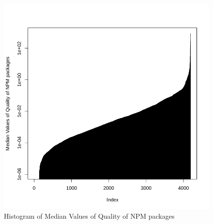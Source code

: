 \documentclass[smallcondensed]{svjour3}     %
\begin{document}
\begin{figure}[!t]
\centering
\includegraphics[width=0.75\linewidth]{qNPM}
\vspace{-10pt}
\caption{Histogram of Median Values of Quality of NPM packages}
\label{fig:qNPM}
\vspace{-10pt}
\end{figure}
\end{document}
